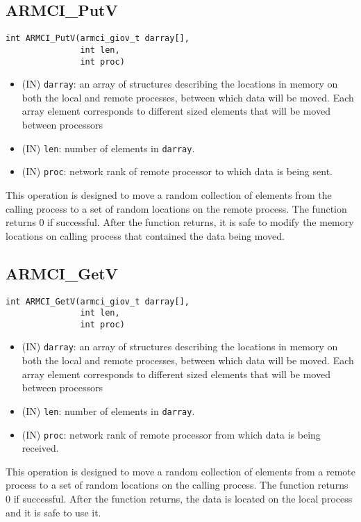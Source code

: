 \documentclass[12pt]{article}
\begin{document}
\subsection{ARMCI\_PutV}
\begin{verbatim}
int ARMCI_PutV(armci_giov_t darray[],
               int len,
               int proc)
\end{verbatim}
\begin{itemize}
\item (IN) \texttt{darray}: an array of structures describing the
locations in memory on both the local and remote processes, between which data
will be moved. Each array element corresponds to different sized elements that
will be moved between processors
\item (IN) \texttt{len}: number of elements in \texttt{darray}.
\item (IN) \texttt{proc}: network rank of remote processor to which data is
being sent.
\end{itemize}
This operation is designed to move a random collection of elements from the
calling process to a set of random locations on the remote process. The
function returns 0 if successful. After the function returns, it is safe to
modify the memory locations on calling process that contained the data being
moved.

\subsection{ARMCI\_GetV}
\begin{verbatim}
int ARMCI_GetV(armci_giov_t darray[],
               int len,
               int proc)
\end{verbatim}
\begin{itemize}
\item (IN) \texttt{darray}: an array of structures describing the
locations in memory on both the local and remote processes, between which data
will be moved. Each array element corresponds to different sized elements that
will be moved between processors
\item (IN) \texttt{len}: number of elements in \texttt{darray}.
\item (IN) \texttt{proc}: network rank of remote processor from which data is
being received.
\end{itemize}
This operation is designed to move a random collection of elements from a
remote process to a set of random locations on the calling process. The
function returns 0 if successful. After the function returns, the data is
located on the local process and it is safe to use it.
\end{document}
